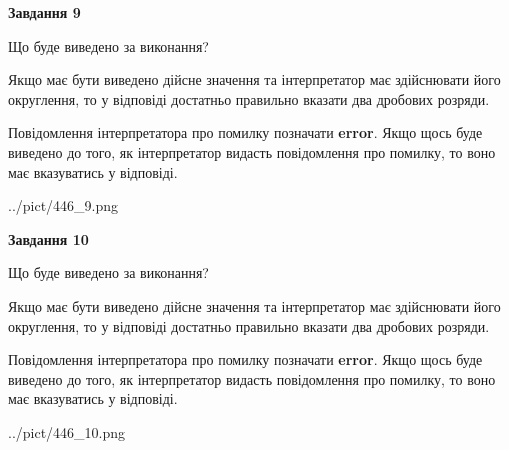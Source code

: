 \documentclass[12pt, ukrainian]{article}
\begin{document}
{\begin {Large}
{\begin {center}\textbf{Завдання 9}\end {center}}\par
Що буде виведено за виконання? \par

Якщо має бути виведено дійсне значення та інтерпретатор має здійснювати його округлення, 
то у відповіді достатньо правильно вказати два дробових розряди.

Повідомлення інтерпретатора про помилку позначати \textbf{error}.
Якщо щось буде виведено до того, як інтерпретатор видасть повідомлення про помилку, 
то воно має вказуватись у відповіді. \par

\begin{center}
	{../pict/446_9.png}
\end{center}
\newpage

{\begin {center}\textbf{Завдання 10}\end {center}}\par
Що буде виведено за виконання? \par

Якщо має бути виведено дійсне значення та інтерпретатор має здійснювати його округлення, 
то у відповіді достатньо правильно вказати два дробових розряди.

Повідомлення інтерпретатора про помилку позначати \textbf{error}.
Якщо щось буде виведено до того, як інтерпретатор видасть повідомлення про помилку, 
то воно має вказуватись у відповіді. \par

\begin{center}
	{../pict/446_10.png}
\end{center}
\newpage

\end {Large}}
\end{document}
